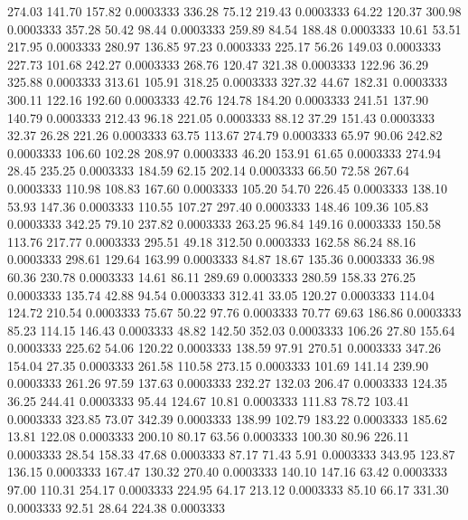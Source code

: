  274.03  141.70  157.82   0.0003333
 336.28   75.12  219.43   0.0003333
  64.22  120.37  300.98   0.0003333
 357.28   50.42   98.44   0.0003333
 259.89   84.54  188.48   0.0003333
  10.61   53.51  217.95   0.0003333
 280.97  136.85   97.23   0.0003333
 225.17   56.26  149.03   0.0003333
 227.73  101.68  242.27   0.0003333
 268.76  120.47  321.38   0.0003333
 122.96   36.29  325.88   0.0003333
 313.61  105.91  318.25   0.0003333
 327.32   44.67  182.31   0.0003333
 300.11  122.16  192.60   0.0003333
  42.76  124.78  184.20   0.0003333
 241.51  137.90  140.79   0.0003333
 212.43   96.18  221.05   0.0003333
  88.12   37.29  151.43   0.0003333
  32.37   26.28  221.26   0.0003333
  63.75  113.67  274.79   0.0003333
  65.97   90.06  242.82   0.0003333
 106.60  102.28  208.97   0.0003333
  46.20  153.91   61.65   0.0003333
 274.94   28.45  235.25   0.0003333
 184.59   62.15  202.14   0.0003333
  66.50   72.58  267.64   0.0003333
 110.98  108.83  167.60   0.0003333
 105.20   54.70  226.45   0.0003333
 138.10   53.93  147.36   0.0003333
 110.55  107.27  297.40   0.0003333
 148.46  109.36  105.83   0.0003333
 342.25   79.10  237.82   0.0003333
 263.25   96.84  149.16   0.0003333
 150.58  113.76  217.77   0.0003333
 295.51   49.18  312.50   0.0003333
 162.58   86.24   88.16   0.0003333
 298.61  129.64  163.99   0.0003333
  84.87   18.67  135.36   0.0003333
  36.98   60.36  230.78   0.0003333
  14.61   86.11  289.69   0.0003333
 280.59  158.33  276.25   0.0003333
 135.74   42.88   94.54   0.0003333
 312.41   33.05  120.27   0.0003333
 114.04  124.72  210.54   0.0003333
  75.67   50.22   97.76   0.0003333
  70.77   69.63  186.86   0.0003333
  85.23  114.15  146.43   0.0003333
  48.82  142.50  352.03   0.0003333
 106.26   27.80  155.64   0.0003333
 225.62   54.06  120.22   0.0003333
 138.59   97.91  270.51   0.0003333
 347.26  154.04   27.35   0.0003333
 261.58  110.58  273.15   0.0003333
 101.69  141.14  239.90   0.0003333
 261.26   97.59  137.63   0.0003333
 232.27  132.03  206.47   0.0003333
 124.35   36.25  244.41   0.0003333
  95.44  124.67   10.81   0.0003333
 111.83   78.72  103.41   0.0003333
 323.85   73.07  342.39   0.0003333
 138.99  102.79  183.22   0.0003333
 185.62   13.81  122.08   0.0003333
 200.10   80.17   63.56   0.0003333
 100.30   80.96  226.11   0.0003333
  28.54  158.33   47.68   0.0003333
  87.17   71.43    5.91   0.0003333
 343.95  123.87  136.15   0.0003333
 167.47  130.32  270.40   0.0003333
 140.10  147.16   63.42   0.0003333
  97.00  110.31  254.17   0.0003333
 224.95   64.17  213.12   0.0003333
  85.10   66.17  331.30   0.0003333
  92.51   28.64  224.38   0.0003333
